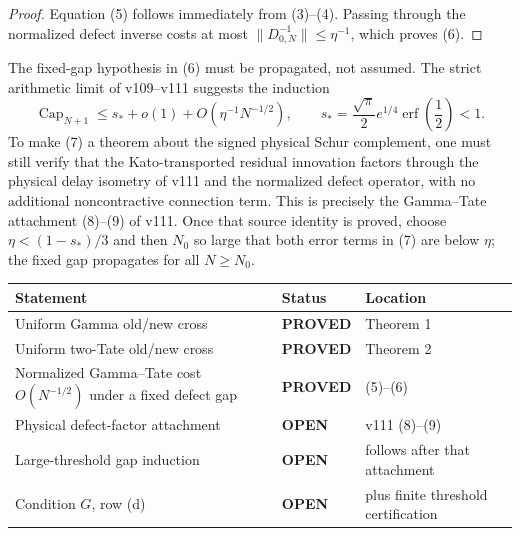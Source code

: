\documentclass[11pt]{article}
\newcommand{\PROVED}{\textcolor{green!40!black}{\textbf{PROVED}}}
\newcommand{\OPEN}{\textcolor{red!70!black}{\textbf{OPEN}}}
\begin{document}
\begin{proof}
Equation (5) follows immediately from (3)--(4).  Passing through the
normalized defect inverse costs at most $\|D_{0,N}^{-1}\|\le\eta^{-1}$,
which proves (6).
\end{proof}

The fixed-gap hypothesis in (6) must be propagated, not assumed.  The
strict arithmetic limit of v109--v111 suggests the induction
\begin{equation}
 \operatorname{Cap}_{N+1}
 \le s_*+o(1)+O(\eta^{-1}N^{-1/2}),
 \qquad
 s_*=\frac{\sqrt\pi}{2}e^{1/4}\operatorname{erf}\!\left(\frac12\right)
 <1.                                                          \tag{7}
\end{equation}
To make (7) a theorem about the signed physical Schur complement, one must
still verify that the Kato-transported residual innovation factors through
the physical delay isometry of v111 and the normalized defect operator,
with no additional noncontractive connection term.  This is precisely the
Gamma--Tate attachment (8)--(9) of v111.  Once that source identity is
proved, choose $\eta<(1-s_*)/3$ and then $N_0$ so large that both error
terms in (7) are below $\eta$; the fixed gap propagates for all
$N\ge N_0$.

\begin{center}
\begin{tabular}{>{\raggedright\arraybackslash}p{.55\linewidth}
                >{\centering\arraybackslash}p{.15\linewidth}
                >{\raggedright\arraybackslash}p{.20\linewidth}}
\toprule
Statement & Status & Location \\
\midrule
Uniform Gamma old/new cross & \PROVED & Theorem 1 \\
Uniform two-Tate old/new cross & \PROVED & Theorem 2 \\
Normalized Gamma--Tate cost $O(N^{-1/2})$ under a fixed defect gap & \PROVED & (5)--(6) \\
Physical defect-factor attachment & \OPEN & v111 (8)--(9) \\
Large-threshold gap induction & \OPEN & follows after that attachment \\
Condition $G$, row (d) & \OPEN & plus finite threshold certification \\
\bottomrule
\end{tabular}
\end{center}
\end{document}
